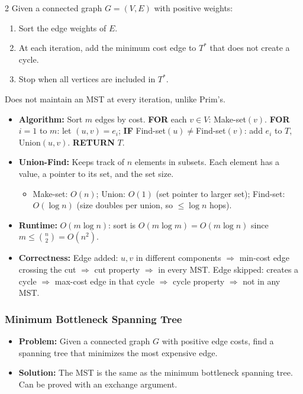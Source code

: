 \documentclass[9pt]{article}
\begin{document}
\begin{multicols}{2}
Given a connected graph $G=(V,E)$ with positive weights:
\begin{enumerate}
  \item Sort the edge weights of $E$.
  \item At each iteration, add the minimum cost edge to $T^*$ that does not create a cycle.
  \item Stop when all vertices are included in $T^*$.
\end{enumerate}
Does not maintain an MST at every iteration, unlike Prim's.

\begin{itemize}
  \item \textbf{Algorithm:} Sort $m$ edges by cost. \textbf{FOR} each $v\in V$: Make-set$(v)$. \textbf{FOR} $i=1$ to $m$: let $(u,v)=e_i$; \textbf{IF} Find-set$(u)\ne$Find-set$(v)$: add $e_i$ to $T$, Union$(u,v)$. \textbf{RETURN} $T$.
  \item \textbf{Union-Find:} Keeps track of $n$ elements in subsets. Each element has a value, a pointer to its set, and the set size.
  \begin{itemize}
    \item Make-set: $O(n)$;\; Union: $O(1)$ (set pointer to larger set);\; Find-set: $O(\log n)$ (size doubles per union, so $\le\log n$ hops).
  \end{itemize}
  \item \textbf{Runtime:} $O(m\log n)$: sort is $O(m\log m)=O(m\log n)$ since $m\le\binom{n}{2}=O(n^2)$.
  \item \textbf{Correctness:} Edge added: $u,v$ in different components $\Rightarrow$ min-cost edge crossing the cut $\Rightarrow$ cut property $\Rightarrow$ in every MST. Edge skipped: creates a cycle $\Rightarrow$ max-cost edge in that cycle $\Rightarrow$ cycle property $\Rightarrow$ not in any MST.
\end{itemize}

\subsubsection*{Minimum Bottleneck Spanning Tree}

\begin{itemize}
  \item \textbf{Problem:} Given a connected graph $G$ with positive edge costs, find a spanning tree that minimizes the most expensive edge.
  \item \textbf{Solution:} The MST is the same as the minimum bottleneck spanning tree. Can be proved with an exchange argument.
\end{itemize}



\end{multicols}
\end{document}
